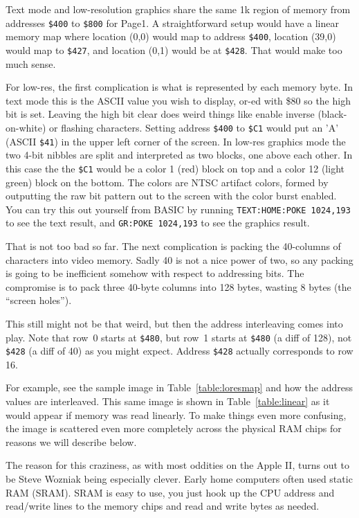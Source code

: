 Text mode and low-resolution graphics share the same 1k region of memory
from addresses {\tt \$400} to {\tt \$800} for Page1.
A straightforward setup would have a linear memory map where
location (0,0) would map to address {\tt \$400}, location (39,0) would map
to {\tt \$427}, and location (0,1) would be at {\tt \$428}.
That would make too much sense.

For low-res, the first complication is what is represented by each 
memory byte.
In text mode this is the ASCII value you wish to display, or-ed with
\$80 so the high bit is set.
Leaving the high bit clear does weird things like enable inverse 
(black-on-white) or flashing characters.
Setting address {\tt \$400} to {\tt \$C1}
would put an 'A' (ASCII {\tt \$41})
in the upper left corner of the screen.
In low-res graphics mode the two 4-bit nibbles are split and
interpreted as two blocks, one above each other.
In this case the the {\tt \$C1} would be a color 1 (red) block on top
and a color 12 (light green) block on the bottom.
The colors are NTSC artifact colors, formed by outputting the raw bit
pattern out to the screen with the color burst enabled.
You can try this out yourself from BASIC by running 
{\tt TEXT:HOME:POKE 1024,193} to see the text result, and
{\tt GR:POKE 1024,193} to see the graphics result.

That is not too bad so far.
The next complication is packing the 40-columns of characters into
video memory.
Sadly 40 is not a nice power of two, so any packing is going to 
be inefficient somehow with respect to addressing bits.
The compromise is to pack three 40-byte columns into 128 bytes,
wasting 8 bytes (the ``screen holes'').

This still might not be that weird, but then the address interleaving
comes into play.
Note that row~0 starts at {\tt \$480}, but row~1 starts at
{\tt \$480} (a diff of 128), not {\tt \$428} (a diff of 40)
as you might expect.
Address {\tt \$428} actually corresponds to row 16.

For example, see the sample image in Table~\ref{table:loresmap} and how
the address values are interleaved.
This same image is shown in Table~\ref{table:linear} as it would
appear if memory was read linearly.
To make things even more confusing, the image is scattered even
more completely across the physical RAM chips for reasons we will
describe below.

The reason for this craziness, as with most oddities on the Apple II,
turns out to be Steve Wozniak being especially clever.
Early home computers often used static RAM (SRAM).
SRAM is easy to use, you just hook up the CPU address and read/write lines
to the memory chips and read and write bytes as needed.

